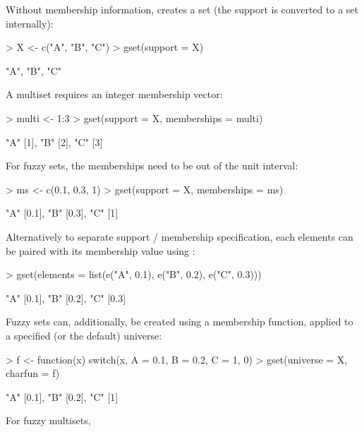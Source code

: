 \documentclass[article]{jss}
\newcommand{\codefun}[1]{\code{#1()}}
\begin{document}
\noindent Without membership information, \codefun{gset} creates a set (the support is converted to a set internally):
\begin{Schunk}
\begin{Sinput}
> X <- c("A", "B", "C")
> gset(support = X)
\end{Sinput}
\begin{Soutput}
{"A", "B", "C"}
\end{Soutput}
\end{Schunk}
A multiset requires an integer membership vector:
\begin{Schunk}
\begin{Sinput}
> multi <- 1:3
> gset(support = X, memberships = multi)
\end{Sinput}
\begin{Soutput}
{"A" [1], "B" [2], "C" [3]}
\end{Soutput}
\end{Schunk}
For fuzzy sets, the memberships need to be out of the unit interval:
\begin{Schunk}
\begin{Sinput}
> ms <- c(0.1, 0.3, 1)
> gset(support = X, memberships = ms)
\end{Sinput}
\begin{Soutput}
{"A" [0.1], "B" [0.3], "C" [1]}
\end{Soutput}
\end{Schunk}
Alternatively to separate support / membership specification, each
elements can be paired with its membership value using \codefun{e}:
\begin{Schunk}
\begin{Sinput}
> gset(elements = list(e("A", 0.1), e("B", 0.2), e("C", 0.3)))
\end{Sinput}
\begin{Soutput}
{"A" [0.1], "B" [0.2], "C" [0.3]}
\end{Soutput}
\end{Schunk}
Fuzzy sets can, additionally, be created using a membership function,
applied to a specified (or the default) universe:
\begin{Schunk}
\begin{Sinput}
> f <- function(x) switch(x, A = 0.1, B = 0.2, C = 1, 0)
> gset(universe = X, charfun = f)
\end{Sinput}
\begin{Soutput}
{"A" [0.1], "B" [0.2], "C" [1]}
\end{Soutput}
\end{Schunk}
For fuzzy multisets,
\end{document}
